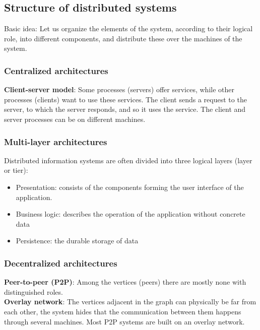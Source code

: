 \documentclass[margin=0px]{article}
\begin{document}
\subsection{Structure of distributed systems}
Basic idea: Let us organize the elements of the system, according to their logical role, into different components, and distribute these
over the machines of the system.\\

\subsubsection{Centralized architectures}

\noindent \textbf{Client-server model}: Some processes (servers) offer services, while other processes (clients)
want to use these services. The client sends a request to the server, to which the server responds, and so it uses
the service. The client and server processes can be on different machines.

\subsubsection{Multi-layer architectures}

Distributed information systems are often divided into three logical layers (layer or tier):

\begin{itemize}
    \item	Presentation: consists of the components forming the user interface of the application.
    \item	Business logic: describes the operation of the application without concrete data
    \item	Persistence: the durable storage of data
\end{itemize}

\subsubsection{Decentralized architectures}

\noindent \textbf{Peer-to-peer (P2P)}: Among the vertices (peers) there are mostly none with distinguished roles.\\

\noindent \textbf{Overlay network}: The vertices adjacent in the graph can physically be far from each other,
the system hides that the communication between them happens through several machines. Most P2P
systems are built on an overlay network.\\
\end{document}
